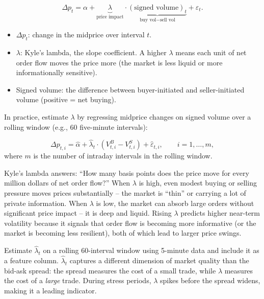 \begin{equation}\label{eq:kyle-lambda}
\Delta p_t = \alpha + \underbrace{\lambda}_{\text{price impact}} \cdot \underbrace{(\text{signed volume})_t}_{\text{buy vol} - \text{sell vol}} + \varepsilon_t.
\end{equation}
\begin{itemize}[nosep]
  \item $\Delta p_t$: change in the midprice over interval $t$.
  \item $\lambda$: Kyle's lambda, the slope coefficient.  A higher $\lambda$ means each unit of net order flow moves the price more (the market is less liquid or more informationally sensitive).
  \item Signed volume: the difference between buyer-initiated and seller-initiated volume (positive = net buying).
\end{itemize}

In practice, estimate $\lambda$ by regressing midprice changes on signed volume over a rolling window (e.g., 60 five-minute intervals):

\begin{equation}\label{eq:kyle-regression}
\Delta p_{t,i} = \hat{\alpha} + \hat{\lambda}_t \cdot (V_{t,i}^B - V_{t,i}^S) + \hat{\varepsilon}_{t,i}, \qquad i = 1, \ldots, m,
\end{equation}
where $m$ is the number of intraday intervals in the rolling window.

\begin{intuition}
Kyle's lambda answers: ``How many basis points does the price move for every million dollars of net order flow?''
When $\lambda$ is high, even modest buying or selling pressure moves prices substantially -- the market is ``thin'' or carrying a lot of private information.
When $\lambda$ is low, the market can absorb large orders without significant price impact -- it is deep and liquid.
Rising $\lambda$ predicts higher near-term volatility because it signals that order flow is becoming more informative (or the market is becoming less resilient), both of which lead to larger price swings.
\end{intuition}

\begin{projectconnection}
Estimate $\hat{\lambda}_t$ on a rolling 60-interval window using 5-minute data and include it as a feature column.
$\hat{\lambda}_t$ captures a different dimension of market quality than the bid-ask spread: the spread measures the cost of a small trade, while $\lambda$ measures the cost of a \emph{large} trade.
During stress periods, $\lambda$ spikes before the spread widens, making it a leading indicator.
\end{projectconnection}

